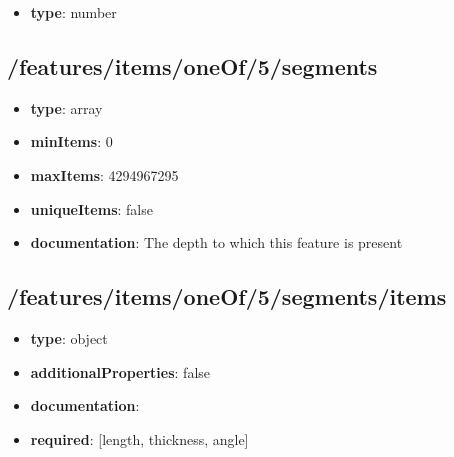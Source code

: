 \begin{itemize}\item {\bf type}: number
\end{itemize}\subsection{/features/items/oneOf/5/segments}
\begin{itemize}\item {\bf type}: array
\item {\bf minItems}: 0
\item {\bf maxItems}: 4294967295
\item {\bf uniqueItems}: false
\item {\bf documentation}: The depth to which this feature is present
\end{itemize}\subsection{/features/items/oneOf/5/segments/items}
\begin{itemize}\item {\bf type}: object
\item {\bf additionalProperties}: false
\item {\bf documentation}: 
\item {\bf required}: [length, thickness, angle]\end{itemize}
